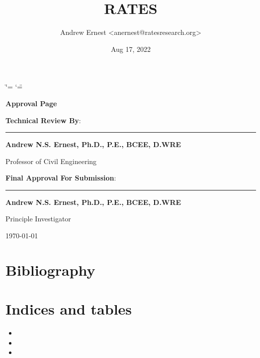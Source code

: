 \documentclass[letterpaper,12pt,english,openany,oneside]{sphinxmanual}
\title{RATES}
\date{Aug 17, 2022}
\author{Andrew Ernest <anernest@ratesresearch.org>}
\begin{document}
\ifdefined\shorthandoff
  \ifnum\catcode`\=\string=\active\shorthandoff{=}\fi
  \ifnum\catcode`\"=\active{}\fi
\fi

\pagestyle{empty}
 
\sphinxmaketitle
    \newcommand\signature[3]{%
    {\sffamily
    \vspace{1cm}\par
    \textbf{#1}:\par
        \begin{minipage}{10cm}
        \centering
        \vspace{3cm}\par
        \rule{10cm}{1pt}\par
        \textbf{#2}\par
        #3%
        \end{minipage}
    }
    }
    \newcommand\insertdate[1][\today]{\vfill\begin{flushright}#1\end{flushright}}
    {\LARGE\sffamily \textbf{Approval Page}}
    
    \signature{Technical Review By}{Andrew N.S. Ernest, Ph.D., P.E., BCEE, D.WRE}{Professor of Civil Engineering}
    
    \signature{Final Approval For Submission}{Andrew N.S. Ernest, Ph.D., P.E., BCEE, D.WRE}{Principle Investigator}
        
    \insertdate

\pagestyle{plain}
\sphinxtableofcontents
\pagestyle{normal}
\label{\detokenize{index::doc}}


\sphinxstepscope


\chapter{Bibliography}
\label{\detokenize{bibliography:bibliography}}\label{\detokenize{bibliography::doc}}
\sphinxAtStartPar



\chapter{Indices and tables}
\label{\detokenize{index:indices-and-tables}}\begin{itemize}
\item {} 
\sphinxAtStartPar
{}

\item {} 
\sphinxAtStartPar
{}

\item {} 
\sphinxAtStartPar
{}

\end{itemize}
\end{document}
